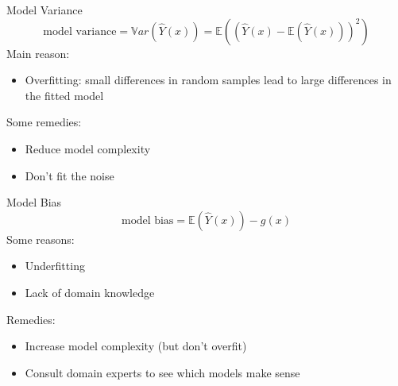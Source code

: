 \documentclass[aspectratio=169]{../latex_main/tntbeamer}  %
\begin{document}
	\begin{frame}[c]{Model Variance}
	    \begin{equation*}
	        \text{model variance} = \mathbb{V}ar(\hat{Y}(x)) = \mathbb{E}((\hat{Y}(x) - \mathbb{E}(\hat{Y}(x)))^2)
	    \end{equation*}
	    Main reason:
	    \begin{itemize}
	        \item Overfitting: small differences in random samples lead to large differences in the fitted model
	    \end{itemize}
	    \bigskip
	    Some remedies:
	    \begin{itemize}
	        \item Reduce model complexity
	        \item Don’t fit the noise
	    \end{itemize}
	\end{frame}
	
	
	\begin{frame}[c]{Model Bias}
	    \begin{equation*}
	        \text{model bias} = \mathbb{E}(\hat{Y}(x)) - g(x)
	    \end{equation*}
	    Some reasons:
	    \begin{itemize}
	        \item Underfitting
	        \item Lack of domain knowledge
	    \end{itemize}
	    \bigskip
	    Remedies:
	    \begin{itemize}
	        \item Increase model complexity (but don’t overfit)
	        \item Consult domain experts to see which models make sense
	    \end{itemize}
	\end{frame}
	
\end{document}

